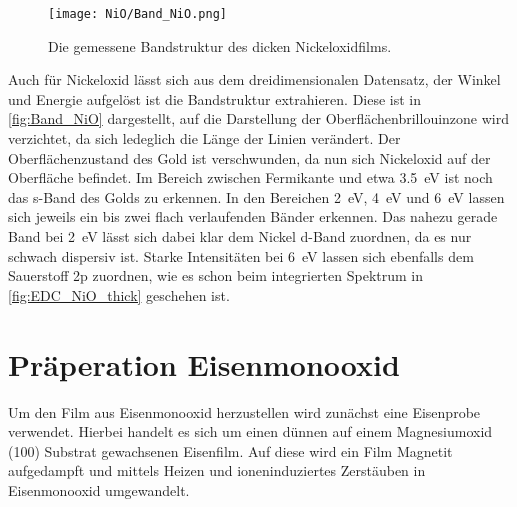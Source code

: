        \begin{figure}
            \centering
            \texttt{[image: NiO/Band\_NiO.png]}
            \caption{Die gemessene Bandstruktur des dicken Nickeloxidfilms.}
            \label{fig:Band_NiO}
        \end{figure}
        Auch für Nickeloxid lässt sich aus dem dreidimensionalen Datensatz, der Winkel und Energie aufgelöst ist die Bandstruktur extrahieren.
        Diese ist in \autoref{fig:Band_NiO} dargestellt, auf die Darstellung der Oberflächenbrillouinzone wird verzichtet, da sich ledeglich die Länge der Linien verändert.
        Der Oberflächenzustand des Gold ist verschwunden, da nun sich Nickeloxid auf der Oberfläche befindet.
        Im Bereich zwischen Fermikante und etwa \SI{3.5}{\electronvolt} ist noch das s-Band des Golds zu erkennen.
        In den Bereichen \SI{2}{\electronvolt}, \SI{4}{\electronvolt} und \SI{6}{\electronvolt} lassen sich jeweils ein bis zwei flach verlaufenden Bänder erkennen.
        Das nahezu gerade Band bei \SI{2}{\electronvolt} lässt sich dabei klar dem Nickel d-Band zuordnen, da es nur schwach dispersiv ist.
        Starke Intensitäten bei \SI{6}{\electronvolt} lassen sich ebenfalls dem Sauerstoff 2p zuordnen, wie es schon beim integrierten Spektrum in \autoref{fig:EDC_NiO_thick} geschehen ist.
        
    \FloatBarrier
    \section{Präperation Eisenmonooxid} \label{sec:Prep_FeO}
        Um den Film aus Eisenmonooxid herzustellen wird zunächst eine Eisenprobe verwendet.
        Hierbei handelt es sich um einen dünnen auf einem Magnesiumoxid (100) Substrat gewachsenen Eisenfilm.
        Auf diese wird ein Film Magnetit aufgedampft und mittels Heizen und ioneninduziertes Zerstäuben in Eisenmonooxid umgewandelt.

